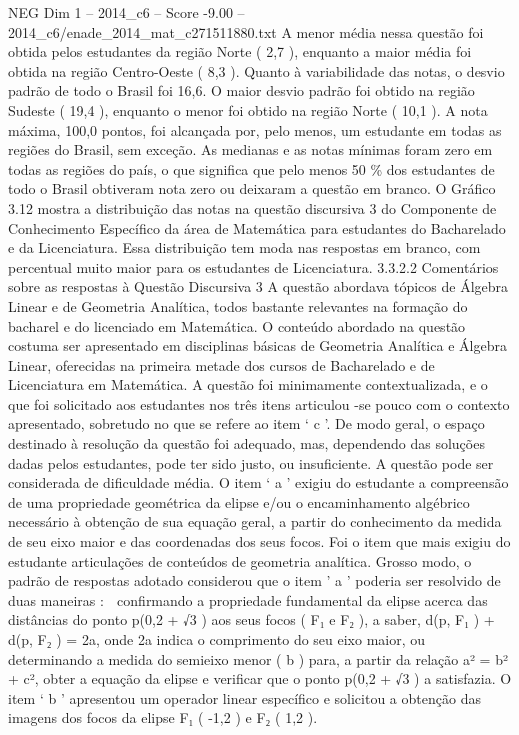 \begin{textsample}{NEG Dim 1 – 2014\_c6 – Score -9.00 – 2014\_c6/enade\_2014\_mat\_c271511880.txt}
A menor média nessa questão foi obtida pelos estudantes da região Norte ( 2,7 ), enquanto a maior média foi obtida na região Centro-Oeste ( 8,3 ).
Quanto à variabilidade das notas, o desvio padrão de todo o Brasil foi 16,6.
O maior desvio padrão foi obtido na região Sudeste ( 19,4 ), enquanto o menor foi obtido na região Norte ( 10,1 ).
A nota máxima, 100,0 pontos, foi alcançada por, pelo menos, um estudante em todas as regiões do Brasil, sem exceção.
As medianas e as notas mínimas foram zero em todas as regiões do país, o que significa que pelo menos 50 \% dos estudantes de todo o Brasil obtiveram nota zero ou deixaram a questão em branco.
O Gráfico 3.12 mostra a distribuição das notas na questão discursiva 3 do Componente de Conhecimento Específico da área de Matemática para estudantes do Bacharelado e da Licenciatura.
Essa distribuição tem moda nas respostas em branco, com percentual muito maior para os estudantes de Licenciatura. 3.3.2.2 Comentários sobre as respostas à Questão Discursiva 3 A questão abordava tópicos de Álgebra Linear e de Geometria Analítica, todos bastante relevantes na formação do bacharel e do licenciado em Matemática.
O conteúdo abordado na questão costuma ser apresentado em disciplinas básicas de Geometria Analítica e Álgebra Linear, oferecidas na primeira metade dos cursos de Bacharelado e de Licenciatura em Matemática.
A questão foi minimamente contextualizada, e o que foi solicitado aos estudantes nos três itens articulou -se pouco com o contexto apresentado, sobretudo no que se refere ao item ‘ c ’.
De modo geral, o espaço destinado à resolução da questão foi adequado, mas, dependendo das soluções dadas pelos estudantes, pode ter sido justo, ou insuficiente.
A questão pode ser considerada de dificuldade média.
O item ‘ a ’ exigiu do estudante a compreensão de uma propriedade geométrica da elipse e/ou o encaminhamento algébrico necessário à obtenção de sua equação geral, a partir do conhecimento da medida de seu eixo maior e das coordenadas dos seus focos.
Foi o item que mais exigiu do estudante articulações de conteúdos de geometria analítica.
Grosso modo, o padrão de respostas adotado considerou que o item ’ a ’ poderia ser resolvido de duas maneiras :  confirmando a propriedade fundamental da elipse acerca das distâncias do ponto p(0,2 + √3 ) aos seus focos ( F₁ e F₂ ), a saber, d(p, F₁ ) + d(p, F₂ ) = 2a, onde 2a indica o comprimento do seu eixo maior, ou  determinando a medida do semieixo menor ( b ) para, a partir da relação a² = b² + c², obter a equação da elipse e verificar que o ponto p(0,2 + √3 ) a satisfazia.
O item ‘ b ’ apresentou um operador linear específico e solicitou a obtenção das imagens dos focos da elipse F₁ ( -1,2 ) e F₂ ( 1,2 ).

\end{textsample}
